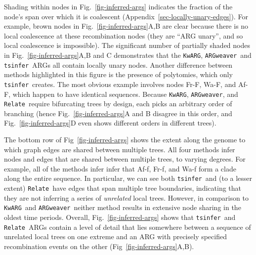 \documentclass[9pt,twocolumn,twoside]{gsajnl}
\newcommand{\noderef}[1]{\textsf{#1}}
\newcommand{\tsinfer}[0]{\texttt{tsinfer}}
\newcommand{\kwarg}[0]{\texttt{KwARG}}
\newcommand{\argweaver}[0]{\texttt{ARGweaver}}
\newcommand{\relate}[0]{\texttt{Relate}}
\begin{document}
Shading within nodes in Fig.~\ref{fig-inferred-args} indicates the
fraction of the node's span over which it is coalescent
(Appendix~\ref{sec-locally-unary-edges}). For example, brown nodes
in Fig.~\ref{fig-inferred-args}A,B are clear because there is
no local coalescence at these recombination nodes
(they are ``ARG unary'', and so local coalescence is impossible).
The significant number of partially shaded nodes in
Fig.~\ref{fig-inferred-args}A,B and C demonstrates that
the \kwarg, \argweaver\ and \tsinfer\ ARGs all contain locally unary nodes.
Another difference between methods highlighted in this figure
is the presence of polytomies, which only
\tsinfer\ creates. The most obvious example
involves nodes \noderef{Fr-F}, \noderef{Wa-F}, and \noderef{Af-F},
which happen to have identical sequences.
Because \kwarg, \argweaver, and \relate\ require
bifurcating trees by design, each picks an arbitrary order of branching
(hence Fig.~\ref{fig-inferred-args}A and B disagree
in this order, and Fig.~\ref{fig-inferred-args}D even shows different
orders in different trees).

The bottom row of Fig~\ref{fig-inferred-args} shows the extent along
the genome to which graph edges are shared between multiple trees.
All four methods infer nodes and edges that are shared between
multiple trees, to varying degrees.
For example, all of the methods infer
infer that \noderef{Af-f}, \noderef{Fr-f}, and \noderef{Wa-f}
form a clade along the entire sequence.
In particular, we can
see both \tsinfer\ and (to a lesser extent) \relate\ have edges
that span multiple tree boundaries, indicating that they are not inferring
a series of \emph{unrelated} local trees.
However, in comparison to \kwarg\ and \argweaver\ neither
method results in extensive node sharing in the
oldest time periods.
Overall, Fig.~\ref{fig-inferred-args} shows
that \tsinfer\ and \relate\ ARGs contain a level of detail
that lies somewhere between a sequence of unrelated local trees on one extreme
and an ARG with precisely specified recombination events on the other
(Fig~\ref{fig-inferred-args}A,B).
\end{document}
